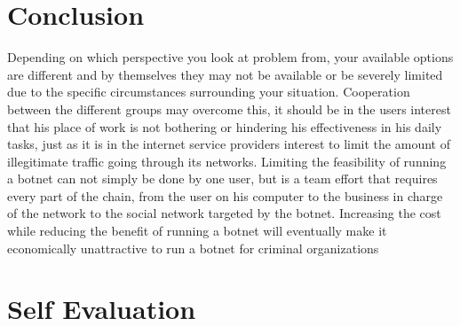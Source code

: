 \section{Conclusion}
Depending on which perspective you look at problem from, your available options are different and by themselves they may not be available or be severely limited due to the specific circumstances surrounding your situation. Cooperation between the different groups may overcome this, it should be in the users interest that his place of work is not bothering or hindering his effectiveness in his daily tasks, just as it is in the internet service providers interest to limit the amount of illegitimate traffic going through its networks. Limiting the feasibility of running a botnet can not simply be done by one user, but is a team effort that requires every part of the chain, from the user on his computer to the business in charge of the network to the social network targeted by the botnet.
Increasing the cost while reducing the benefit of running a botnet will eventually make it economically unattractive to run a botnet for criminal organizations
\section*{Self Evaluation}